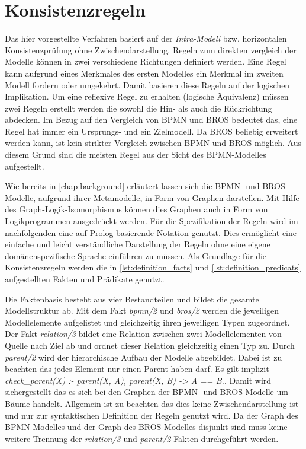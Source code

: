 \section{Konsistenzregeln} \label{sec:Konsistenzregeln}

Das hier vorgestellte Verfahren basiert auf der \emph{Intra-Modell} bzw. horizontalen Konsistenzprüfung ohne Zwischendarstellung.
Regeln zum direkten vergleich der Modelle können in zwei verschiedene Richtungen definiert werden.
Eine Regel kann aufgrund eines Merkmales des ersten Modelles ein Merkmal im zweiten Modell fordern oder umgekehrt.
Damit basieren diese Regeln auf der logischen Implikation.
Um eine reflexive Regel zu erhalten (logische Äquivalenz) müssen zwei Regeln erstellt werden die sowohl die Hin- als auch die Rückrichtung abdecken.
Im Bezug auf den Vergleich von BPMN und BROS bedeutet das, eine Regel hat immer ein Ursprungs- und ein Zielmodell.
Da BROS beliebig erweitert werden kann, ist kein strikter Vergleich zwischen BPMN und BROS möglich.
Aus diesem Grund sind die meisten Regel aus der Sicht des BPMN-Modelles aufgestellt.

Wie bereits in \cref{chap:background} erläutert lassen sich die BPMN- und BROS-Modelle, aufgrund ihrer Metamodelle, in Form von Graphen darstellen.
Mit Hilfe des Graph-Logik-Isomorphismus können dies Graphen auch in Form von Logikprogrammen ausgedrückt werden.
Für die Spezifikation der Regeln wird im nachfolgenden eine auf Prolog basierende Notation genutzt.
Dies ermöglicht eine einfache und leicht verständliche Darstellung der Regeln ohne eine eigene domänenspezifische Sprache einführen zu müssen.
Als Grundlage für die Konsistenzregeln werden die in \cref{lst:definition_facts} und \cref{lst:definition_predicats} aufgestellten Fakten und Prädikate genutzt.

Die Faktenbasis besteht aus vier Bestandteilen und bildet die gesamte Modellstruktur ab.
Mit dem Fakt \emph{bpmn/2} und \emph{bros/2} werden die jeweiligen Modellelemente aufgelistet und gleichzeitig ihren jeweiligen Typen zugeordnet.
Der Fakt \emph{relation/3} bildet eine Relation zwischen zwei Modellelementen von Quelle nach Ziel ab und ordnet dieser Relation gleichzeitig einen Typ zu.
Durch \emph{parent/2} wird der hierarchische Aufbau der Modelle abgebildet.
Dabei ist zu beachten das jedes Element nur einen Parent haben darf.
Es gilt implizit \emph{check\_parent(X) :- parent(X, A), parent(X, B) -> A == B.}.
Damit wird sichergestellt das es sich bei den Graphen der BPMN- und BROS-Modelle um Bäume handelt.
Allgemein ist zu beachten das dies keine Zwischendarstellung ist und nur zur syntaktischen Definition der Regeln genutzt wird.
Da der Graph des BPMN-Modelles und der Graph des BROS-Modelles disjunkt sind muss keine weitere Trennung der \emph{relation/3} und \emph{parent/2} Fakten durchgeführt werden.

